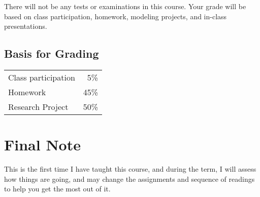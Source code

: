 \documentclass[11pt,twoside]{jgsyllabus}\usepackage[]{graphicx}\usepackage[]{xcolor}
\begin{document}
There will not be any tests or examinations in this course. Your grade will be
based on class participation, homework, modeling projects, and in-class
presentations.

\subsection[Grades]{Basis for Grading}

\begin{tabular}{|lr|}
\hline
Class participation &  5\% \\
Homework            & 45\% \\
Research Project    & 50\% \\
\hline
\end{tabular}

\section{Final Note}

This is the first time I have taught this course, and during the term, I will
assess how things are going, and may change the assignments and sequence of
readings to help you get the most out of it.
\end{document}
